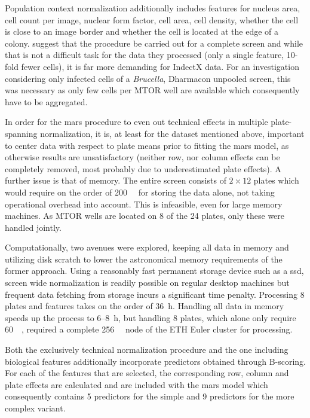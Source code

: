 Population context normalization additionally includes features for nucleus area, cell count per image, nuclear form factor, cell area, cell density, whether the cell is close to an image border and whether the cell is located at the edge of a colony. \citeauthor{Knapp2011} suggest that the procedure be carried out for a complete screen and while that is not a difficult task for the data they processed (only a single feature, 10-fold fewer cells), it is far more demanding for IndectX data. For an investigation considering only infected cells of a \textit{Brucella}, Dharmacon unpooled screen, this was necessary as only few cells per MTOR well are available which consequently have to be aggregated.

In order for the \gls{mars} procedure to even out technical effects in multiple plate-spanning normalization, it is, at least for the dataset mentioned above, important to center data with respect to plate means prior to fitting the \gls{mars} model, as otherwise results are unsatisfactory (neither row, nor column effects can be completely removed, most probably due to underestimated plate effects). A further issue is that of memory. The entire screen consists of $2 \times 12$ plates which would require on the order of \SI{200}{\giga\byte} for storing the data alone, not taking operational overhead into account. This is infeasible, even for large memory machines. As MTOR wells are located on 8 of the 24 plates, only these were handled jointly.

Computationally, two avenues were explored, keeping all data in memory and utilizing disk scratch to lower the astronomical memory requirements of the former approach. Using a reasonably fast permanent storage device such as a \gls{ssd}, screen wide normalization is readily possible on regular desktop machines but frequent data fetching from storage incurs a significant time penalty. Processing 8 plates and  features takes on the order of \SI{36}{\hour}. Handling all data in memory speeds up the process to 6--\SI{8}{\hour}, but handling 8 plates, which alone only require \tilde \SI{60}{\giga\byte}, required a complete \SI{256}{\giga\byte} node of the ETH Euler cluster for processing.

Both the exclusively technical normalization procedure and the one including biological features additionally incorporate predictors obtained through B-scoring. For each of the features that are selected, the corresponding row, column and plate effects are calculated and are included with the mars model which consequently contains 5 predictors for the simple and 9 predictors for the more complex variant.

